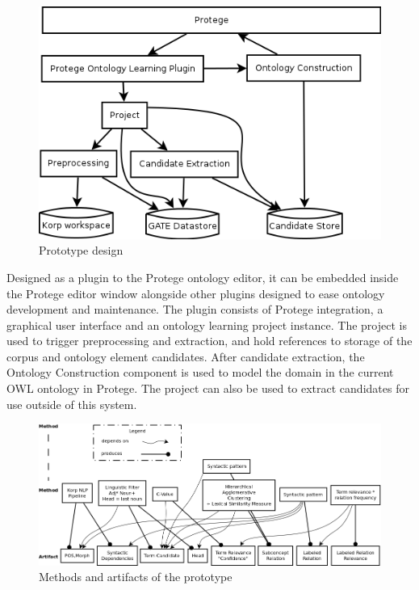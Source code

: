 \documentclass[a4paper]{report}
\begin{document}
\begin{figure}
  \includegraphics[width=\textwidth]{graphics/protege-plugin-components-simple.png}
  \caption{Prototype design}
  \label{fig:prototype-design}
\end{figure}

Designed as a plugin to the Protege ontology editor, it can be embedded inside the Protege editor window alongside other plugins designed to ease ontology development and maintenance.
The plugin consists of Protege integration, a graphical user interface and an ontology learning project instance.
The project is used to trigger preprocessing and extraction, and hold references to storage of the corpus and ontology element candidates. After candidate extraction, the Ontology Construction component is used to model the domain in the current OWL ontology in Protege. The project can also be used to extract candidates for use outside of this system.

\begin{figure}
  \includegraphics[width=\textwidth]{graphics/method-element-dependencies.png}
  \caption{Methods and artifacts of the prototype}
  \label{fig:method-artifact}
\end{figure}
\end{document}
